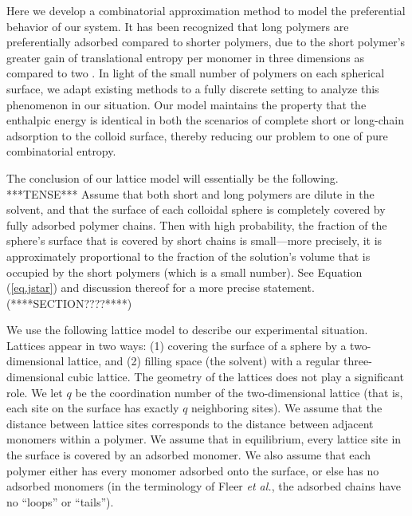 \documentclass[journal=mamobx,manuscript=article]{achemso}
\begin{document}
Here we develop a combinatorial approximation method %
to model the preferential behavior of our system.
It has been recognized that long polymers are
preferentially adsorbed compared to shorter polymers,
due to the short polymer's greater gain of
translational entropy per monomer in three dimensions
as compared to two 
\cite{Fleer1993}.  
In light of the small number of polymers on each
spherical surface, we adapt existing methods to a
fully discrete setting to analyze this phenomenon in our
situation.  Our model maintains the property that the enthalpic energy is identical in both the scenarios of complete short or long-chain adsorption to the colloid surface, thereby reducing our problem
to one of pure combinatorial entropy. 

The conclusion of our lattice model will essentially
be the following. ***TENSE***
Assume that both short and long polymers 
are dilute in the solvent, and that the 
surface of each colloidal sphere is completely covered 
by fully adsorbed polymer chains.  Then with high probability, 
the fraction of the sphere's surface that is 
covered by short chains is small---more precisely, it 
is approximately proportional
to the fraction of the solution's volume that is
occupied by the short polymers (which is a small
number).  See  Equation (\ref{eq.jstar}) and discussion thereof for a more precise statement.   (****SECTION????****)


We use the following lattice model to describe our experimental situation.  
Lattices appear in two ways:  (1) covering the surface of a sphere by a two-dimensional lattice, and
(2) filling space (the solvent) with a regular three-dimensional cubic lattice.  
The geometry of the lattices does not play a significant role.  
We let $q$ be the coordination number of the two-dimensional lattice 
(that is, each site on the surface has exactly $q$ neighboring sites).  We assume that 
the distance between lattice sites corresponds to the distance between adjacent monomers within a polymer.  
We assume that in equilibrium, every lattice site in the surface is covered by an adsorbed monomer.
We also assume that each polymer either has every monomer adsorbed onto the surface, or else has no adsorbed monomers (in the terminology of Fleer \textit{et al.}\cite{Fleer1993}, the adsorbed chains
have no ``loops'' or ``tails'').
\end{document}
